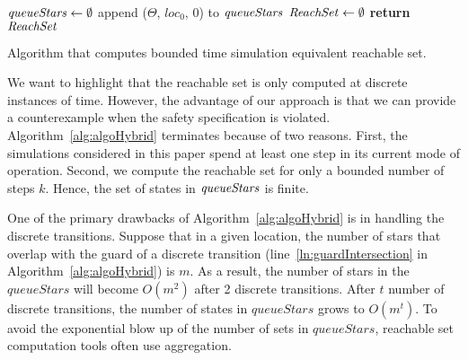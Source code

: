 \begin{algorithm}[h!]
\SetAlgoVlined
{}
${\it queueStars} \gets \emptyset$\; 
append ($\Theta$, $loc_0$, $0$) to ${\it queueStars}$\; 
${\it ReachSet} \gets \emptyset$\;
{\bf return} ${\it ReachSet}$\;
\caption{Algorithm that computes bounded time simulation equivalent reachable set.}
\label{alg:algoHybrid}
\end{algorithm}

We want to highlight that the reachable set is only computed at discrete instances of time.
%
However, the advantage of our approach is that we can provide a counterexample when the safety specification is violated.
%
Algorithm~\ref{alg:algoHybrid} terminates because of two reasons. First, the simulations considered in this paper spend at least one step in its current mode of operation. Second, we compute the reachable set for only a bounded number of steps $k$. Hence, the set of states in ${\it queueStars}$ is finite.

One of the primary drawbacks of Algorithm~\ref{alg:algoHybrid} is in handling the discrete transitions. 
%
Suppose that in a given location, the number of stars that overlap with the guard of a discrete transition (line~\ref{ln:guardIntersection} in Algorithm~\ref{alg:algoHybrid}) is $m$.
%
As a result, the number of stars in the $queueStars$ will become $O(m^2)$ after 2 discrete transitions. After $t$ number of discrete transitions, the number of states in $queueStars$ grows to $O(m^t)$.
%
To avoid the exponential blow up of the number of sets in $queueStars$, reachable set computation tools often use aggregation.

